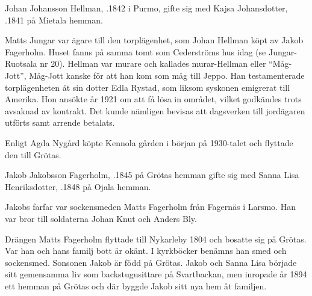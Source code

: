

Johan Johansson Hellman, .1842 i Purmo, gifte sig med Kajsa Johansdotter, .1841 på Mietala hemman.
\begin{jhchildren}
  \item {}
  \item {}
  \item {}
  \item {}
\end{jhchildren}
Matts Jungar var ägare till den torplägenhet, som Johan Hellman köpt av Jakob Fagerholm. Huset fanns på samma tomt som Cederströms hus idag (se Jungar-Ruotsala nr 20). Hellman var murare och kallades murar-Hellman eller ``Måg-Jott'', Måg-Jott kanske för att han kom som måg till Jeppo. Han testamenterade torplägenheten åt sin dotter Edla Rystad, som liksom syskonen emigrerat till Amerika. Hon ansökte år 1921 om att få lösa in området, vilket godkändes trots avsaknad av kontrakt. Det kunde nämligen bevisas att dagsverken till jordägaren utförts samt arrende betalats.

Enligt Agda Nygård köpte Kennola gården i början på 1930-talet och flyttade den till Grötas.


Jakob Jakobsson Fagerholm, .1845 på Grötas hemman gifte sig med Sanna Lisa Henriksdotter, .1848 på	Ojala hemman.
\begin{jhchildren}
  \item {}
  \item {}
  \item {}
  \item {}
\end{jhchildren}
Jakobs farfar var sockensmeden Matts Fagerholm från Fagernäs i Larsmo. Han var bror till soldaterna Johan Knut och Anders Bly.

Drängen Matts Fagerholm flyttade till Nykarleby 1804 och bosatte sig på Grötas. Var han och hans familj bott är okänt. I kyrkböcker benämns han smed och sockensmed. Sonsonen Jakob är född på Grötas. Jakob och Sanna Lisa började sitt gemensamma liv som backstugusittare på Svartbackan, men inropade år 1894 ett hemman på Grötas och där byggde Jakob sitt nya hem åt familjen.

